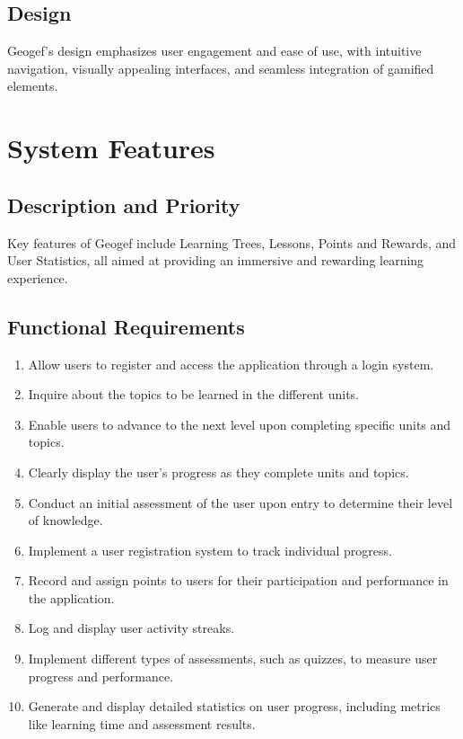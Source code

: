 \documentclass{scrreprt}
\begin{document}
\section{Design}
Geogef's design emphasizes user engagement and ease of use, with intuitive navigation, visually appealing interfaces, and seamless integration of gamified elements.

\chapter{System Features}

\section{Description and Priority}
Key features of Geogef include Learning Trees, Lessons, Points and Rewards, and User Statistics, all aimed at providing an immersive and rewarding learning experience.

\section{Functional Requirements}
\begin{enumerate}
    \item Allow users to register and access the application through a login system.
    \item Inquire about the topics to be learned in the different units.
    \item Enable users to advance to the next level upon completing specific units and topics.
    \item Clearly display the user's progress as they complete units and topics.
    \item Conduct an initial assessment of the user upon entry to determine their level of knowledge.
    \item Implement a user registration system to track individual progress.
    \item Record and assign points to users for their participation and performance in the application.
    \item Log and display user activity streaks.
    \item Implement different types of assessments, such as quizzes, to measure user progress and performance.
    \item  Generate and display detailed statistics on user progress, including metrics like learning time and assessment results.
\end{enumerate}
\end{document}
